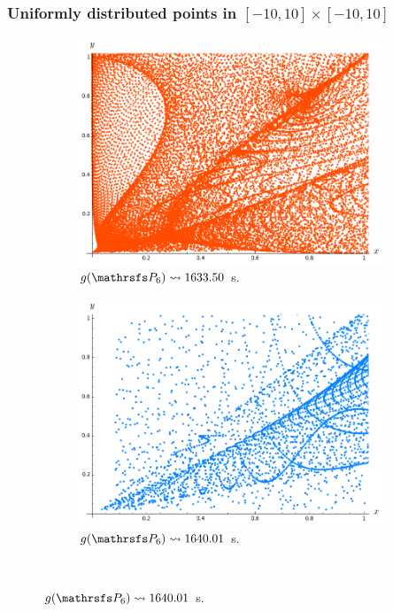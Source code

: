 \documentclass{beamer}
\begin{document}
\begin{frame}
\frametitle{Uniformly distributed points in $[-10, 10] \times [-10, 10]$}

\begin{figure}
\vspace{-0.2cm}
\begin{subfigure}{.38\linewidth}\centering
\includegraphics[width=1\textwidth]{plots/ch5_17_P6prime.png}
\vspace{-0.1cm}\caption{$g(\PP_6)\leadsto 1633.50$ s.}
\end{subfigure}
\hspace{0.8cm}
\begin{subfigure}{.38\linewidth}\centering
\includegraphics[width=1\textwidth]{plots/ch5_20_P6prime.png}
\vspace{-0.1cm}\caption{$g(\PP_6)\leadsto 1640.01$ s.}
\end{subfigure}\\[1ex]


\end{figure}
\end{frame}
\end{document}
